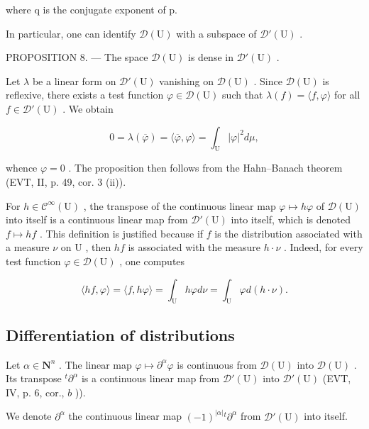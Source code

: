 where q is the conjugate exponent of p.

In particular, one can identify \(\mathcal{D}(\mathrm{U})\) with a subspace of \(\mathcal{D}'(\mathrm{U})\) .

PROPOSITION 8. --- The space \(\mathcal{D}(\mathrm{U})\) is dense in \(\mathcal{D}'(\mathrm{U})\) .

Let \(\lambda\) be a linear form on \(\mathcal{D}'(\mathrm{U})\) vanishing on \(\mathcal{D}(\mathrm{U})\) . Since \(\mathcal{D}(\mathrm{U})\) is reflexive, there exists a test function \(\varphi \in \mathcal{D}(\mathrm{U})\) such that \(\lambda(f) = \langle f, \varphi \rangle\) for all \(f \in \mathcal{D}'(\mathrm{U})\) . We obtain

\[
0 = \lambda (\overline {{\varphi}}) = \langle \overline {{\varphi}}, \varphi \rangle = \int_ {\mathrm{U}} | \varphi | ^ {2} d \mu ,
\]

whence \(\varphi = 0\) . The proposition then follows from the Hahn--Banach theorem (EVT, II, p. 49, cor. 3 (ii)).

For \(h \in \mathcal{C}^{\infty}(\mathrm{U})\) , the transpose of the continuous linear map \(\varphi \mapsto h\varphi\) of \(\mathcal{D}(\mathrm{U})\) into itself is a continuous linear map from \(\mathcal{D}'(\mathrm{U})\) into itself, which is denoted \(f \mapsto hf\) . This definition is justified because if \(f\) is the distribution associated with a measure \(\nu\) on \(\mathrm{U}\) , then \(hf\) is associated with the measure \(h \cdot \nu\) . Indeed, for every test function \(\varphi \in \mathcal{D}(\mathrm{U})\) , one computes

\[
\langle h f, \varphi \rangle = \langle f, h \varphi \rangle = \int_ {\mathrm{U}} h \varphi d \nu = \int_ {\mathrm{U}} \varphi d (h \cdot \nu).
\]

\subsection{Differentiation of distributions}

Let \(\alpha \in \mathbf{N}^n\) . The linear map \(\varphi \mapsto \partial^\alpha \varphi\) is continuous from \(\mathcal{D}(\mathrm{U})\) into \(\mathcal{D}(\mathrm{U})\) . Its transpose \(^t\partial^\alpha\) is a continuous linear map from \(\mathcal{D}'(\mathrm{U})\) into \(\mathcal{D}'(\mathrm{U})\) (EVT, IV, p. 6, cor., \(b\) )).

We denote \(\partial^{\alpha}\) the continuous linear map \((-1)^{|\alpha|}{}^{t}\partial^{\alpha}\) from \(\mathcal{D}'(\mathrm{U})\) into itself.

